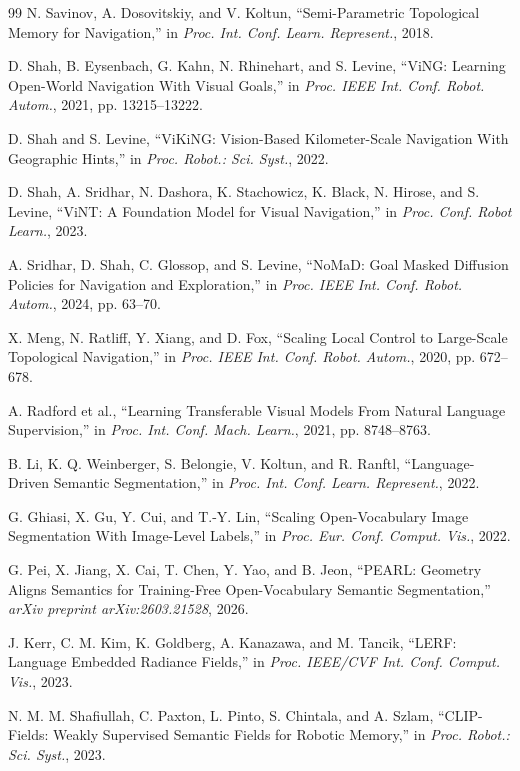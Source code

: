 \documentclass[letterpaper,10pt,conference]{ieeeconf}
\begin{document}
{\begin{thebibliography}{99}
N. Savinov, A. Dosovitskiy, and V. Koltun,
``Semi-Parametric Topological Memory for Navigation,'' in \emph{Proc. Int.
Conf. Learn. Represent.}, 2018.

D. Shah, B. Eysenbach, G. Kahn, N. Rhinehart, and S. Levine,
``ViNG: Learning Open-World Navigation With Visual Goals,'' in \emph{Proc.
IEEE Int. Conf. Robot. Autom.}, 2021, pp. 13215--13222.

D. Shah and S. Levine,
``ViKiNG: Vision-Based Kilometer-Scale Navigation With Geographic Hints,''
in \emph{Proc. Robot.: Sci. Syst.}, 2022.

D. Shah, A. Sridhar, N. Dashora, K. Stachowicz, K. Black, N. Hirose, and
S. Levine,
``ViNT: A Foundation Model for Visual Navigation,'' in \emph{Proc. Conf.
Robot Learn.}, 2023.

A. Sridhar, D. Shah, C. Glossop, and S. Levine,
``NoMaD: Goal Masked Diffusion Policies for Navigation and Exploration,''
in \emph{Proc. IEEE Int. Conf. Robot. Autom.}, 2024, pp. 63--70.

X. Meng, N. Ratliff, Y. Xiang, and D. Fox,
``Scaling Local Control to Large-Scale Topological Navigation,'' in
\emph{Proc. IEEE Int. Conf. Robot. Autom.}, 2020, pp. 672--678.

A. Radford et al.,
``Learning Transferable Visual Models From Natural Language Supervision,''
in \emph{Proc. Int. Conf. Mach. Learn.}, 2021, pp. 8748--8763.

B. Li, K. Q. Weinberger, S. Belongie, V. Koltun, and R. Ranftl,
``Language-Driven Semantic Segmentation,'' in \emph{Proc. Int. Conf. Learn.
Represent.}, 2022.

G. Ghiasi, X. Gu, Y. Cui, and T.-Y. Lin,
``Scaling Open-Vocabulary Image Segmentation With Image-Level Labels,'' in
\emph{Proc. Eur. Conf. Comput. Vis.}, 2022.

G. Pei, X. Jiang, X. Cai, T. Chen, Y. Yao, and B. Jeon,
``PEARL: Geometry Aligns Semantics for Training-Free Open-Vocabulary Semantic
Segmentation,'' \emph{arXiv preprint arXiv:2603.21528}, 2026.

J. Kerr, C. M. Kim, K. Goldberg, A. Kanazawa, and M. Tancik,
``LERF: Language Embedded Radiance Fields,'' in \emph{Proc. IEEE/CVF Int.
Conf. Comput. Vis.}, 2023.

N. M. M. Shafiullah, C. Paxton, L. Pinto, S. Chintala, and A. Szlam,
``CLIP-Fields: Weakly Supervised Semantic Fields for Robotic Memory,'' in
\emph{Proc. Robot.: Sci. Syst.}, 2023.


\end{thebibliography}}
\end{document}
